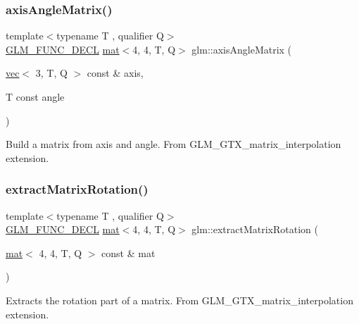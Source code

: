 \subsubsection{\texorpdfstring{axis\+Angle\+Matrix()}{axisAngleMatrix()}}
{\footnotesize\ttfamily template$<$typename T , qualifier Q$>$ \\
\mbox{\hyperlink{setup_8hpp_ab2d052de21a70539923e9bcbf6e83a51}{G\+L\+M\+\_\+\+F\+U\+N\+C\+\_\+\+D\+E\+CL}} \mbox{\hyperlink{structglm_1_1mat}{mat}}$<$4, 4, T, Q$>$ glm\+::axis\+Angle\+Matrix (\begin{DoxyParamCaption}\item[{\mbox{\hyperlink{structglm_1_1vec}{vec}}$<$ 3, T, Q $>$ const \&}]{axis,  }\item[{T const}]{angle }\end{DoxyParamCaption})}

Build a matrix from axis and angle. From G\+L\+M\+\_\+\+G\+T\+X\+\_\+matrix\+\_\+interpolation extension. \mbox{\label{group__gtx__matrix__interpolation_ga8834d4499a1a52fcf531b4506f0b5f67}} 
\subsubsection{\texorpdfstring{extract\+Matrix\+Rotation()}{extractMatrixRotation()}}
{\footnotesize\ttfamily template$<$typename T , qualifier Q$>$ \\
\mbox{\hyperlink{setup_8hpp_ab2d052de21a70539923e9bcbf6e83a51}{G\+L\+M\+\_\+\+F\+U\+N\+C\+\_\+\+D\+E\+CL}} \mbox{\hyperlink{structglm_1_1mat}{mat}}$<$4, 4, T, Q$>$ glm\+::extract\+Matrix\+Rotation (\begin{DoxyParamCaption}\item[{\mbox{\hyperlink{structglm_1_1mat}{mat}}$<$ 4, 4, T, Q $>$ const \&}]{mat }\end{DoxyParamCaption})}

Extracts the rotation part of a matrix. From G\+L\+M\+\_\+\+G\+T\+X\+\_\+matrix\+\_\+interpolation extension. \mbox{\label{group__gtx__matrix__interpolation_gad5fc63a2e084000b39f6508ab07421a5}} 
